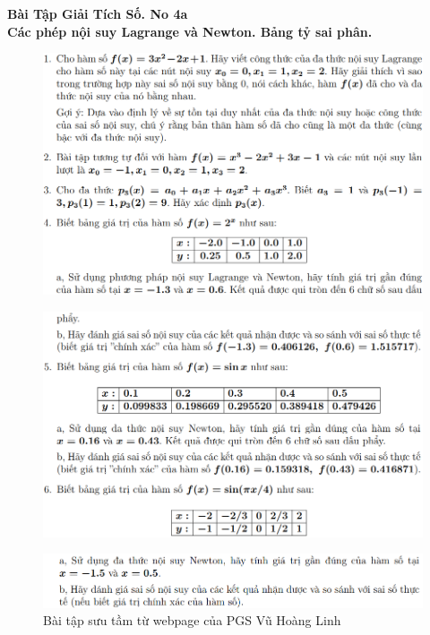 \documentclass[11pt]{article}
\begin{document}



\begin{center}
	{\bf Bài Tập Giải Tích Số. No 4a \\ Các phép nội suy Lagrange và Newton. Bảng tỷ sai phân.}
\end{center}
%

\begin{figure}[h!]
	\centering
	\includegraphics[scale = 0.5]{"Figures/Exe_sheet_No6_1"}
\end{figure}

\begin{figure}[h!]
	\centering
	\includegraphics[scale = 0.5]{"Figures/Exe_sheet_No6_2"}
\end{figure}

\begin{figure}[ht]
	\centering
	\includegraphics[scale = 0.5]{"Figures/Exe_sheet_No6_3"}
	\caption{Bài tập sưu tầm từ webpage của PGS Vũ Hoàng Linh}
\end{figure}
\end{document}

